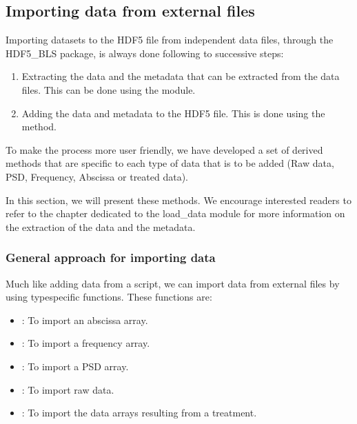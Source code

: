 \documentclass[letterpaper,10pt,english]{sphinxmanual}
\begin{document}
\subsection{Importing data from external files}
\label{\detokenize{source/hdf5_bls_package:importing-data-from-external-files}}
\sphinxAtStartPar
Importing datasets to the HDF5 file from independent data files, through the HDF5\_BLS package, is always done following to successive steps:
\begin{enumerate}
%
\item {} 
\sphinxAtStartPar
Extracting the data and the metadata that can be extracted from the data files. This can be done using the  module.

\item {} 
\sphinxAtStartPar
Adding the data and metadata to the HDF5 file. This is done using the  method.

\end{enumerate}

\sphinxAtStartPar
To make the process more user friendly, we have developed a set of derived methods that are specific to each type of data that is to be added (Raw data, PSD, Frequency, Abscissa or treated data).

\sphinxAtStartPar
In this section, we will present these methods. We encourage interested readers to refer to the chapter dedicated to the load\_data module for more information on the extraction of the data and the metadata.


\subsubsection{General approach for importing data}
\label{\detokenize{source/hdf5_bls_package:general-approach-for-importing-data}}
\sphinxAtStartPar
Much like adding data from a script, we can import data from external files by using type\sphinxhyphen{}specific functions. These functions are:
\begin{itemize}
\item {} 
\sphinxAtStartPar
{}: To import an abscissa array.

\item {} 
\sphinxAtStartPar
{}: To import a frequency array.

\item {} 
\sphinxAtStartPar
{}: To import a PSD array.

\item {} 
\sphinxAtStartPar
{}: To import raw data.

\item {} 
\sphinxAtStartPar
{}: To import the data arrays resulting from a treatment.

\end{itemize}
\end{document}
